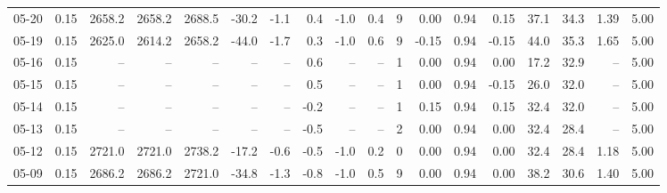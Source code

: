 \begin{threeparttable}
{\begin{tabular}{lrrrrrrrrrrrrrrrrr}
  05-20 &     0.15 & 2658.2 & 2658.2 & 2688.5 &      -30.2 &           -1.1 &                       0.4 &                     -1.0 &                 0.4 &              9 &       0.00 &      0.94 &           0.15 &             37.1 &                34.3 &            1.39 &                   5.00 \\
  05-19 &     0.15 & 2625.0 & 2614.2 & 2658.2 &      -44.0 &           -1.7 &                       0.3 &                     -1.0 &                 0.6 &              9 &      -0.15 &      0.94 &          -0.15 &             44.0 &                35.3 &            1.65 &                   5.00 \\
  05-16 &     0.15 &     -- &     -- &     -- &         -- &             -- &                       0.6 &                       -- &                  -- &              1 &       0.00 &      0.94 &           0.00 &             17.2 &                32.9 &              -- &                   5.00 \\
  05-15 &     0.15 &     -- &     -- &     -- &         -- &             -- &                       0.5 &                       -- &                  -- &              1 &       0.00 &      0.94 &          -0.15 &             26.0 &                32.0 &              -- &                   5.00 \\
  05-14 &     0.15 &     -- &     -- &     -- &         -- &             -- &                      -0.2 &                       -- &                  -- &              1 &       0.15 &      0.94 &           0.15 &             32.4 &                32.0 &              -- &                   5.00 \\
  05-13 &     0.15 &     -- &     -- &     -- &         -- &             -- &                      -0.5 &                       -- &                  -- &              2 &       0.00 &      0.94 &           0.00 &             32.4 &                28.4 &              -- &                   5.00 \\
  05-12 &     0.15 & 2721.0 & 2721.0 & 2738.2 &      -17.2 &           -0.6 &                      -0.5 &                     -1.0 &                 0.2 &              0 &       0.00 &      0.94 &           0.00 &             32.4 &                28.4 &            1.18 &                   5.00 \\
  05-09 &     0.15 & 2686.2 & 2686.2 & 2721.0 &      -34.8 &           -1.3 &                      -0.8 &                     -1.0 &                 0.5 &              9 &       0.00 &      0.94 &           0.00 &             38.2 &                30.6 &            1.40 &                   5.00 \\

\end{tabular}}
\end{threeparttable}
